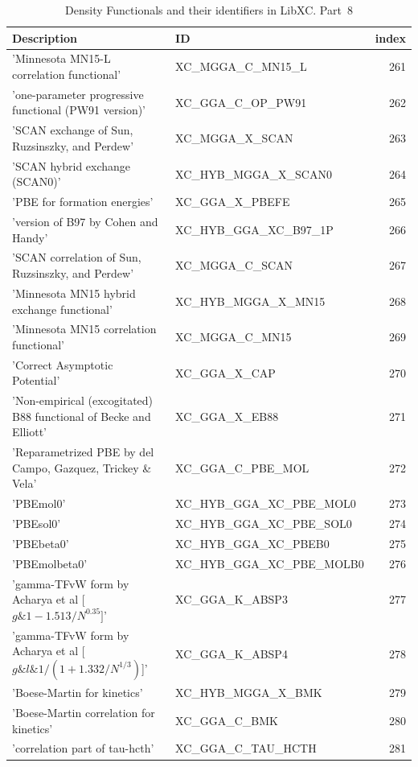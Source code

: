 \documentclass[final,12pt,makeidx,DIV=calc]{article}
\begin{document}
{{{{{{\begin{table}[!h]
\caption{Density Functionals and their identifiers in LibXC. Part~8}
\begin{center}
\begin{tabular}{llr}
\hline
\hline
Description & ID & index\\
\hline
  'Minnesota MN15-L correlation functional' & XC\_MGGA\_C\_MN15\_L  &261\\
  'one-parameter progressive functional (PW91 version)' & XC\_GGA\_C\_OP\_PW91  &262\\
  'SCAN exchange of Sun, Ruzsinszky, and Perdew' & XC\_MGGA\_X\_SCAN  &263\\
  'SCAN hybrid exchange (SCAN0)' & XC\_HYB\_MGGA\_X\_SCAN0  &264\\
  'PBE for formation energies' & XC\_GGA\_X\_PBEFE  &265\\
  'version of B97 by Cohen and Handy' & XC\_HYB\_GGA\_XC\_B97\_1P  &266\\
  'SCAN correlation of Sun, Ruzsinszky, and Perdew' & XC\_MGGA\_C\_SCAN  &267\\
  'Minnesota MN15 hybrid exchange functional' & XC\_HYB\_MGGA\_X\_MN15  &268\\
  'Minnesota MN15 correlation functional' & XC\_MGGA\_C\_MN15  &269\\
  'Correct Asymptotic Potential' & XC\_GGA\_X\_CAP  &270\\
  'Non-empirical (excogitated) B88 functional of Becke and Elliott' & XC\_GGA\_X\_EB88  &271\\
  'Reparametrized PBE by del Campo, Gazquez, Trickey \& Vela' & XC\_GGA\_C\_PBE\_MOL  &272\\
  'PBEmol0' & XC\_HYB\_GGA\_XC\_PBE\_MOL0  &273\\
  'PBEsol0' & XC\_HYB\_GGA\_XC\_PBE\_SOL0  &274\\
  'PBEbeta0' & XC\_HYB\_GGA\_XC\_PBEB0  &275\\
  'PBEmolbeta0' & XC\_HYB\_GGA\_XC\_PBE\_MOLB0  &276\\
  'gamma-TFvW form by Acharya et al [$g \& 1 - 1.513/N^{0.35}]$' & XC\_GGA\_K\_ABSP3  &277\\
  'gamma-TFvW form by Acharya et al [$g \& l \& 1/(1 + 1.332/N^{1/3})$]' & XC\_GGA\_K\_ABSP4  &278\\
  'Boese-Martin for kinetics' & XC\_HYB\_MGGA\_X\_BMK  &279\\
  'Boese-Martin correlation for kinetics' & XC\_GGA\_C\_BMK  &280\\
  'correlation part of tau-hcth' & XC\_GGA\_C\_TAU\_HCTH  &281\\

\end{tabular}
\end{center}
\end{table}}}}}}}
\end{document}
